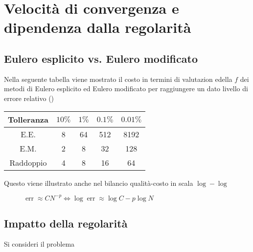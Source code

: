 \documentclass[hidelinks, 10pt]{report}
\begin{document}
\section{Velocit\`a di convergenza e dipendenza dalla regolarit\`a}
\subsection{Eulero esplicito vs. Eulero modificato}

Nella seguente tabella viene mostrato il costo in termini di valutazion edella $ f $ dei metodi di Eulero esplicito ed Eulero modificato per raggiungere un dato livello di errore relativo ()	%

\begin{tabular}{c|c|c|c|c}
	Tolleranza & $ 10\% $ & $ 1\% $ & $ 0.1\% $ & $ 0.01\% $ \\
\hline
	E.E. & 8 & 64 & 512 & 8192 \\
\hline
	E.M. & 2 & 8 & 32 & 128 \\
\hline
	Raddoppio & 4 & 8 & 16 & 64 \\
\end{tabular}

Questo viene illustrato anche nel bilancio qualit\`a-costo in scala $ \log-\log $

\begin{center}
\begin{figure}[H]

\caption{$ \mathop{err} \approx C N^{-p} \iff \log \mathop{err} \approx \log C - p \log N $}
\end{figure}
\end{center}

\subsection{Impatto della regolarit\`a}
Si consideri il problema
\end{document}
